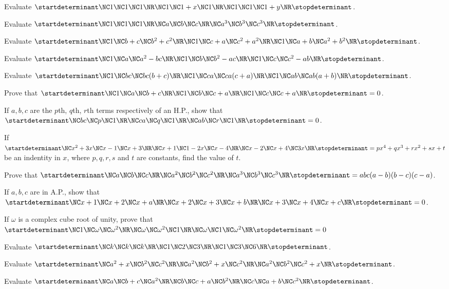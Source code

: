 \item Evaluate $\startdeterminant\NC 1 \NC 1 \NC 1\NR\NC  1 \NC 1 + x \NC 1\NR\NC  1 \NC 1 \NC 1 +y\NR\stopdeterminant$.
\item Evaluate $\startdeterminant\NC 1 \NC 1 \NC 1\NR\NC a \NC b \NC c\NR\NC a^3 \NC b^3 \NC c^3\NR\stopdeterminant$.
\item Evaluate $\startdeterminant\NC 1 \NC b + c \NC b^2 + c^2\NR\NC 1 \NC c + a \NC c^2 + a^2\NR\NC  1 \NC a + b \NC a^2 + b^2\NR\stopdeterminant$.
\item Evaluate $\startdeterminant\NC 1 \NC a \NC a^2 - bc\NR\NC  1 \NC b \NC b^2 - ac\NR\NC  1 \NC c \NC c^2 - ab\NR\stopdeterminant$.
\item Evaluate $\startdeterminant\NC 1 \NC bc \NC bc(b + c)\NR\NC  1 \NC ca \NC ca(c + a)\NR\NC  1\NC ab \NC ab(a + b)\NR\stopdeterminant$.
\item Prove that $\startdeterminant\NC 1 \NC a \NC b + c\NR\NC 1 \NC b \NC c + a\NR\NC 1 \NC c \NC c + a\NR\stopdeterminant = 0$.
\item If $a, b, c$ are the $p$th, $q$th, $r$th terms respectively of an H.P., show that $\startdeterminant\NC  bc \NC p \NC 1\NR\NC  ca \NC q \NC
  1\NR\NC  ab \NC r \NC 1\NR\stopdeterminant = 0$.
\item If $\startdeterminant\NC  x^2 + 3x \NC x - 1 \NC x + 3\NR\NC  x + 1 \NC 1 - 2x \NC x - 4\NR\NC  x - 2 \NC x + 4 \NC 3x\NR\stopdeterminant = px^4 + qx^3 + rx^2 +
  sx + t$ be an indentity in $x$, where $p, q, r, s$ and $t$ are constants, find the value of $t$.
\item Prove that $\startdeterminant\NC  a \NC b \NC c\NR\NC a^2 \NC b^2 \NC c^2\NR\NC a^3 \NC b^3 \NC c^3\NR\stopdeterminant = abc(a - b)(b - c)(c - a)$.
\item If $a, b, c$ are in A.P., show that $\startdeterminant\NC  x + 1 \NC x + 2 \NC x + a\NR\NC  x + 2 \NC x + 3 \NC x + b \NR\NC  x + 3 \NC x + 4 \NC x +
  c\NR\stopdeterminant = 0$.
\item If $\omega$ is a complex cube root of unity, prove that $\startdeterminant\NC  1 \NC \omega \NC \omega^2\NR\NC \omega \NC \omega^2 \NC 1\NR\NC \omega
  \NC 1 \NC \omega^2\NR\stopdeterminant = 0$
\item Evaluate $\startdeterminant\NC  k \NC k \NC k\NR\NC 1 \NC 2 \NC 3\NR\NC  1\NC 3 \NC 6\NR\stopdeterminant$.
\item Evaluate $\startdeterminant\NC  a^2 + x \NC b^2 \NC c^2\NR\NC a^2 \NC b^2 + x \NC c^2\NR\NC a^2 \NC b^2 \NC c^2 + x\NR\stopdeterminant$.
\item Evaluate $\startdeterminant\NC  a \NC b + c \NC a^2\NR\NC b \NC c + a \NC b^2\NR\NC c \NC a + b \NC c^2\NR\stopdeterminant$.
